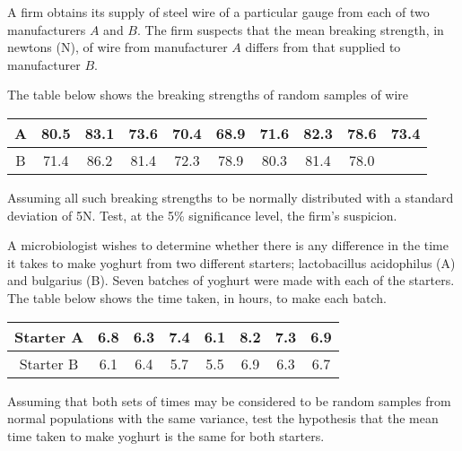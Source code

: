 \begin{mdframed}
    \vspace{-0.25cm}
    \hspace{-0.25cm}
    \begin{Exercise}
        A firm obtains its supply of steel wire of a particular gauge from each of two 
        manufacturers $A$ and $B$. The firm suspects that the mean breaking strength, in 
        newtons (N), of wire from manufacturer $A$ differs from that supplied to 
        manufacturer $B$.

        The table below shows the breaking strengths of random samples of wire 
        \begin{center}
            \begin{tabular}{c|ccccccccc}
            A &  80.5 & 83.1 & 73.6 & 70.4 & 68.9 & 71.6 & 82.3 & 78.6 & 73.4\\
            \hline
            B &  71.4 & 86.2 & 81.4 & 72.3 & 78.9 & 80.3 & 81.4 & 78.0 & \\       
        \end{tabular}
        \end{center}

        Assuming all such breaking strengths to be normally distributed with a 
        standard deviation of 5N. Test, at the 5\% significance level, the firm's 
        suspicion.
    \end{Exercise}

    \begin{Exercise}
        A microbiologist wishes to determine whether
        there is any difference in the time it takes to
        make yoghurt from two different starters;
        lactobacillus acidophilus (A) and bulgarius (B).
        Seven batches of yoghurt were made with each
        of the starters. The table below shows the time
        taken, in hours, to make each batch.
        \begin{center}
            \begin{tabular}{c|ccccccc}
            Starter A & 6.8 & 6.3 & 7.4 & 6.1 & 8.2 & 7.3 & 6.9\\
            \hline
            Starter B & 6.1 & 6.4 & 5.7 & 5.5 & 6.9 & 6.3 & 6.7\\
        \end{tabular}
        \end{center}
        
        Assuming that both sets of times may be considered to be random samples from normal
        populations with the same variance, test the
        hypothesis that the mean time taken to make
        yoghurt is the same for both starters.
    \end{Exercise}


\end{mdframed}
